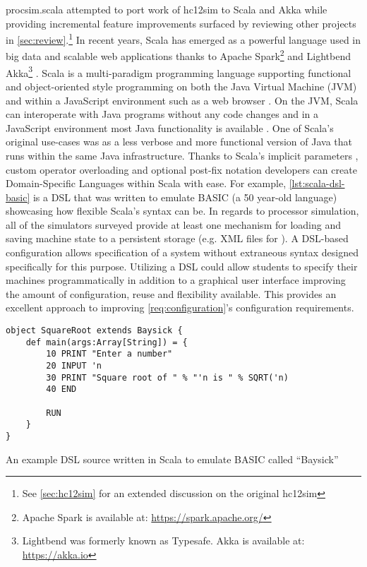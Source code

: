 procsim.scala attempted to port work of hc12sim to Scala and Akka while providing incremental feature improvements surfaced by reviewing other projects in \cref{sec:review}.\footnote{See \cref{sec:hc12sim} for an extended discussion on the original hc12sim} In recent years, Scala has emerged as a powerful language used in big data and scalable web applications thanks to Apache Spark\footnote{Apache Spark is available at: \url{https://spark.apache.org/}} and Lightbend Akka\footnote{Lightbend was formerly known as Typesafe. Akka is available at: \url{https://akka.io}} \cite{Karau2015, Alexandrov2014, Singh2015}. Scala is a multi-paradigm programming language supporting functional and object-oriented style programming on both the Java Virtual Machine (JVM) and within a JavaScript environment such as a web browser \cite{Scala-Lang}. On the JVM, Scala can interoperate with Java programs without any code changes and in a JavaScript environment most Java functionality is available \cite{Scala-js2015,Doeraene2017}. One of Scala's original use-cases was as a less verbose and more functional version of Java that runs within the same Java infrastructure. Thanks to Scala's implicit parameters \cite{Scala-ImplicitParameters}, custom operator overloading \cite{Scala-Operators} and optional post-fix notation \cite{Scala-MethodInvocations} developers can create Domain-Specific Languages within Scala with ease. For example, \cref{lst:scala-dsl-basic} is a DSL that was written to emulate BASIC (a 50 year-old language) showcasing how flexible Scala's syntax can be. In regards to processor simulation, all of the simulators surveyed provide at least one mechanism for loading and saving machine state to a persistent storage (e.g. XML files for \cite{Skrien2001, Black2013}). A DSL-based configuration allows specification of a system without extraneous syntax designed specifically for this purpose. Utilizing a DSL could allow students to specify their machines programmatically in addition to a graphical user interface improving the amount of configuration, reuse and flexibility available. This provides an excellent approach to improving \cref{req:configuration}'s configuration requirements.

\begin{listing}[b!]
\begin{verbatim}
object SquareRoot extends Baysick {
    def main(args:Array[String]) = {
        10 PRINT "Enter a number"
        20 INPUT 'n
        30 PRINT "Square root of " % "'n is " % SQRT('n)
        40 END
        
        RUN
    }
}
\end{verbatim}
\caption{An example DSL source written in Scala to emulate BASIC called ``Baysick'' \cite{FogusBaysick}}
\label{lst:scala-dsl-basic}
\end{listing}

